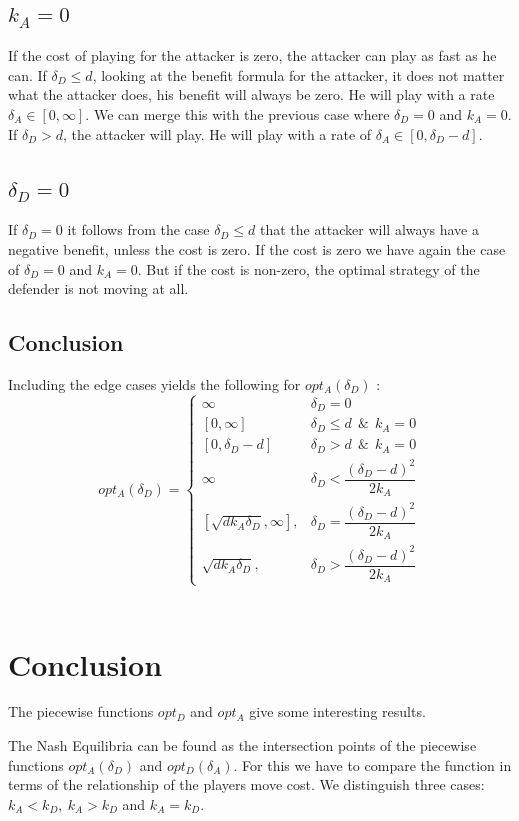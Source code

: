 \subsection*{$k_{A}=0$}
If the cost of playing for the attacker is zero, the attacker can play as fast as he can.  If $\delta_{D} \leq d$, looking at the benefit formula for the attacker, it does not matter what the attacker does, his benefit will always be zero. He will play with a rate $\delta_{A} \in [0,\infty ]$.  We can merge this with the previous case where $\delta_{D}=0$ and $k_{A}=0$.  If $\delta_{D} > d$, the attacker will play. He will play with a rate of $\delta_{A} \in [0, \delta_{D} - d ]$. 
\subsection*{$\delta_{D}=0$}
If $\delta_{D}=0$ it follows from the case $\delta_{D} \leq d$ that the attacker will always have a negative benefit, unless the cost is zero. If the cost is zero we have again the case of $\delta_{D}=0$ and $k_{A}=0$. But if the cost is non-zero, the optimal strategy of the defender is not moving at all. 

\subsection{Conclusion}
Including the edge cases yields the following for $opt_{A}(\delta_{D})$ : \\

 \begin{displaymath}
  opt_{A}(\delta_{D}) = \left\{
     \begin{array}{lr}
     \infty & \delta_{D} = 0 \\
     \left[0,\infty\right] & \delta_{D} \leq d ~~\& ~~k_{A}=0 \\
          \left[0,\delta_{D} - d\right] & \delta_{D} > d ~~\& ~~k_{A}=0 \\
                 \infty & \delta_{D} < \dfrac{(\delta_{D}-d)^{2}}{2k_{A}} \\
       \left[ \sqrt{d k_{A}\delta_{D}}, \infty\right],  & \delta_{D} = \dfrac{(\delta_{D}-d)^{2}}{2k_{A}} \\
       \sqrt{d k_{A}\delta_{D}}, & \delta_{D} > \dfrac{(\delta_{D}-d)^{2}}{2k_{A}}
     \end{array}
   \right.
\end{displaymath}
\\

\section{Conclusion}

The piecewise functions $opt_{D}$ and $opt_{A}$ give some interesting results. 

The Nash Equilibria can be found as the intersection points of the piecewise functions $opt_{A}(\delta_{D})$ and $opt_{D}(\delta_{A})$. For this we have to compare the function in terms of the relationship of the players move cost. We distinguish three cases: $k_{A} < k_{D} , ~k_{A} > k_{D} $ and $k_{A} = k_{D}$. 
